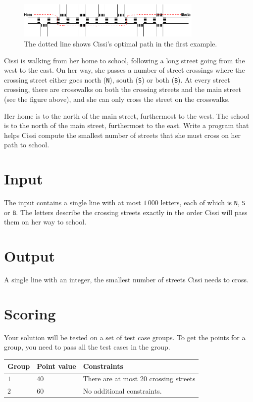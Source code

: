 
\begin{figure}[!h]
\begin{center}
\includegraphics[width=0.8\textwidth]{skolvag.png}
\end{center}
\caption{The dotted line shows Cissi's optimal path in the first example.}
\end{figure}

\noindent
Cissi is walking from her home to school, following a long street going from the west to the east.
On her way, she passes a number of street crossings where the crossing street either goes north (\texttt{N}), south (\texttt{S}) or both (\texttt{B}).
At every street crossing, there are crosswalks on both the crossing streets and the main street (see the figure above), and she can only cross the street on the crosswalks.

Her home is to the north of the main street, furthermost to the west.
The school is to the north of the main street, furthermost to the east.
Write a program that helps Cissi compute the smallest number of streets that she must cross on her path to school.

\section*{Input}
The input contains a single line with at most $1\,000$ letters, each of which is {\tt N}, {\tt S} or {\tt B}.
The letters describe the crossing streets exactly in the order Cissi will pass them on her way to school.

\section*{Output}
A single line with an integer, the smallest number of streets Cissi needs to cross.

\section*{Scoring}
Your solution will be tested on a set of test case groups.
To get the points for a group, you need to pass all the test cases in the group.


\noindent
\begin{tabular}{| l | l | p{12cm} |}
  \hline
  \textbf{Group} & \textbf{Point value} & \textbf{Constraints} \\ \hline
  $1$    & $40$        & There are at most $20$ crossing streets \\ \hline 
  $2$    & $60$        & No additional constraints. \\ \hline
\end{tabular}

